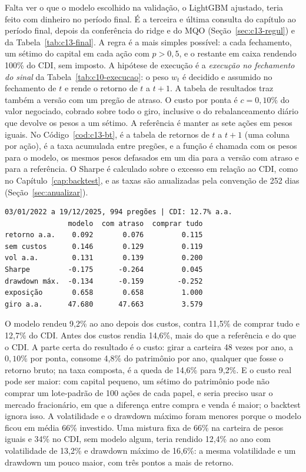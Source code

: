 Falta ver o que o modelo escolhido na validação, o LightGBM ajustado, teria feito com dinheiro no período final. É a terceira e última consulta do capítulo ao período final, depois da conferência do ridge e do MQO (Seção~\ref{sec:c13-regul}) e da Tabela~\ref{tab:c13-final}. A regra é a mais simples possível: a cada fechamento, um sétimo do capital em cada ação com $p > 0,5$, e o restante em caixa rendendo 100\% do CDI, sem imposto. A hipótese de execução é a \emph{execução no fechamento do sinal} da Tabela~\ref{tab:c10-execucao}: o peso $w_t$ é decidido e assumido no fechamento de $t$ e rende o retorno de $t$ a $t+1$. A tabela de resultados traz também a versão com um pregão de atraso. O custo por ponta é $c = 0,10\%$ do valor negociado, cobrado sobre todo o giro, inclusive o do rebalanceamento diário que devolve os pesos a um sétimo. A referência é manter as sete ações em pesos iguais. No Código~\ref{cod:c13-bt},  é a tabela de retornos de $t$ a $t+1$ (uma coluna por ação),  é a taxa acumulada entre pregões, e a função  é chamada com os pesos  para o modelo, os mesmos pesos defasados em um dia para a versão com atraso e  para a referência. O Sharpe é calculado sobre o excesso em relação ao CDI, como no Capítulo~\ref{cap:backtest}, e as taxas são anualizadas pela convenção de 252 dias (Seção~\ref{sec:anualizar}).


\begin{lstlisting}[style=saida]
03/01/2022 a 19/12/2025, 994 pregões | CDI: 12.7% a.a.
               modelo  com atraso  comprar tudo
retorno a.a.    0.092       0.076         0.115
sem custos      0.146       0.129         0.119
vol a.a.        0.131       0.139         0.200
Sharpe         -0.175      -0.264         0.045
drawdown máx.  -0.134      -0.159        -0.252
exposição       0.658       0.658         1.000
giro a.a.      47.680      47.663         3.579
\end{lstlisting}

O modelo rendeu 9,2\% ao ano depois dos custos, contra 11,5\% de comprar tudo e 12,7\% do CDI. Antes dos custos rendia 14,6\%, mais do que a referência e do que o CDI. A parte certa do resultado é o custo: girar a carteira 48 vezes por ano, a $0,10\%$ por ponta, consome 4,8\% do patrimônio por ano, qualquer que fosse o retorno bruto; na taxa composta, é a queda de 14,6\% para 9,2\%. E o custo real pode ser maior: com capital pequeno, um sétimo do patrimônio pode não comprar um lote-padrão de 100 ações de cada papel, e seria preciso usar o mercado fracionário, em que a diferença entre compra e venda é maior; o backtest ignora isso. A volatilidade e o drawdown máximo foram menores porque o modelo ficou em média 66\% investido. Uma mistura fixa de 66\% na carteira de pesos iguais e 34\% no CDI, sem modelo algum, teria rendido 12,4\% ao ano com volatilidade de 13,2\% e drawdown máximo de 16,6\%: a mesma volatilidade e um drawdown um pouco maior, com três pontos a mais de retorno.

